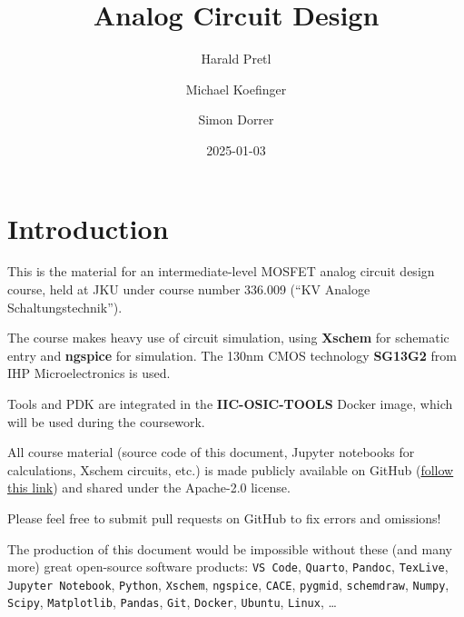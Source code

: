 \documentclass[
  a4paper,
  DIV=11,
  numbers=noendperiod]{scrartcl}
\title{Analog Circuit Design}
\author{Harald Pretl \and Michael Koefinger \and Simon Dorrer}
\date{2025-01-03}
\renewcommand*\contentsname{Table of contents}
\newcommand\contentsname{Table of contents}
\begin{document}
\maketitle

\renewcommand*\contentsname{Table of contents}
{
\hypersetup{linkcolor=}
\setcounter{tocdepth}{3}
\tableofcontents
}

\section{Introduction}\label{sec-intro}

This is the material for an intermediate-level MOSFET analog circuit
design course, held at JKU under course number 336.009 (``KV Analoge
Schaltungstechnik'').

The course makes heavy use of circuit simulation, using \textbf{Xschem}
for schematic entry and \textbf{ngspice} for simulation. The 130nm CMOS
technology \textbf{SG13G2} from IHP Microelectronics is used.

Tools and PDK are integrated in the \textbf{IIC-OSIC-TOOLS} Docker
image, which will be used during the coursework.

\begin{tcolorbox}[enhanced jigsaw, toprule=.15mm, titlerule=0mm, left=2mm, leftrule=.75mm, toptitle=1mm, breakable, colframe=quarto-callout-important-color-frame, colback=white, colbacktitle=quarto-callout-important-color!10!white, opacityback=0, arc=.35mm, coltitle=black, bottomtitle=1mm, title=\textcolor{quarto-callout-important-color}{\faExclamation}\hspace{0.5em}{Important}, bottomrule=.15mm, rightrule=.15mm, opacitybacktitle=0.6]

All course material (source code of this document, Jupyter notebooks for
calculations, Xschem circuits, etc.) is made publicly available on
GitHub (\href{https://github.com/iic-jku/analog-circuit-design}{follow
this link}) and shared under the Apache-2.0 license.

Please feel free to submit pull requests on GitHub to fix errors and
omissions!

The production of this document would be impossible without these (and
many more) great open-source software products: \texttt{VS\ Code},
\texttt{Quarto}, \texttt{Pandoc}, \texttt{TexLive},
\texttt{Jupyter\ Notebook}, \texttt{Python}, \texttt{Xschem},
\texttt{ngspice}, \texttt{CACE}, \texttt{pygmid}, \texttt{schemdraw},
\texttt{Numpy}, \texttt{Scipy}, \texttt{Matplotlib}, \texttt{Pandas},
\texttt{Git}, \texttt{Docker}, \texttt{Ubuntu}, \texttt{Linux}, \ldots{}

\end{tcolorbox}
\end{document}
